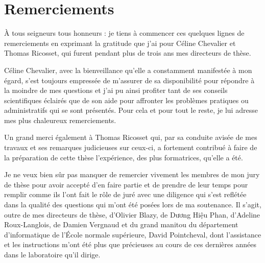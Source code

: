 

\chapter*{Remerciements} %
\label{cha:acknowledgements}




À tous seigneurs tous honneurs : je tiens à commencer ces quelques lignes de remerciements en exprimant la gratitude que j’ai pour Céline Chevalier et Thomas Ricosset, qui furent pendant plus de trois ans mes directeurs de thèse.\par

Céline Chevalier, avec la bienveillance qu’elle a constamment manifestée à mon égard, s’est toujours empressée de m’assurer de sa disponibilité pour répondre à la moindre de mes questions et j’ai pu ainsi profiter tant de ses conseils scientifiques éclairés que de son aide pour affronter les problèmes pratiques ou administratifs qui se sont présentés.
Pour cela et pour tout le reste, je lui adresse mes plus chaleureux remerciements.\par

Un grand merci également à Thomas Ricosset qui, par sa conduite avisée de mes travaux et ses remarques judicieuses sur ceux-ci, a fortement contribué à faire de la préparation de cette thèse l’expérience, des plus formatrices, qu’elle a été.\par

Je ne veux bien sûr pas manquer de remercier vivement les membres de mon jury de thèse pour avoir accepté d’en faire partie et de prendre de leur temps pour remplir comme ils l’ont fait le rôle de juré avec une diligence qui s’est reflétée dans la qualité des questions qui m’ont été posées lors de ma soutenance.
Il s’agit, outre de mes directeurs de thèse, d’Olivier Blazy, de Dương Hiệu Phan, d’Adeline Roux-Langlois, de Damien Vergnaud et du grand manitou du département d’informatique de l’École normale supérieure, David Pointcheval, dont l’assistance et les instructions m’ont été plus que précieuses au cours de ces dernières années dans le laboratoire qu’il dirige.\par

